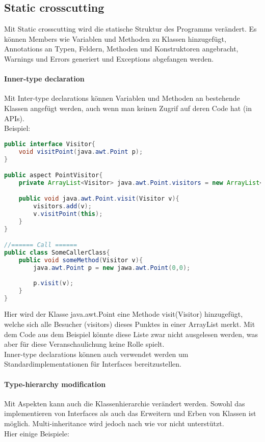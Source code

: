 

\subsection{Static crosscutting}

Mit Static crosscutting wird die statische Struktur des Programms verändert. Es können Members wie Variablen und Methoden zu Klassen hinzugefügt, Annotations an Typen, Feldern, Methoden und Konstruktoren angebracht, Warnings und Errors generiert und Exceptions abgefangen werden.

\paragraph{Inner-type declaration}

Mit Inter-type declarations können Variablen und Methoden an bestehende Klassen angefügt werden, auch wenn man keinen Zugrif auf deren Code hat (in APIs).\\Beispiel:\\


\begin{lstlisting}[language=Java]
public interface Visitor{
	void visitPoint(java.awt.Point p);
}

public aspect PointVisitor{
	private ArrayList<Visitor> java.awt.Point.visitors = new ArrayList<Visitor>();

	public void java.awt.Point.visit(Visitor v){
		visitors.add(v);
		v.visitPoint(this);
	}
}

//====== Call ======
public class SomeCallerClass{
	public void someMethod(Visitor v){
		java.awt.Point p = new jawa.awt.Point(0,0);
		
		p.visit(v);
	}
}
\end{lstlisting}

Hier wird der Klasse java.awt.Point eine Methode visit(Visitor) hinzugefügt, welche sich alle Besucher (visitors) dieses Punktes in einer ArrayList merkt. Mit dem Code aus dem Beispiel könnte diese Liste zwar nicht ausgelesen werden, was aber für diese Veranschaulichung keine Rolle spielt.\\
Inner-type declarations können auch verwendet werden um Standardimplementationen für Interfaces bereitzustellen.

\paragraph{Type-hierarchy modification}
Mit Aspekten kann auch die Klassenhierarchie verändert werden. Sowohl das implementieren von Interfaces als auch das Erweitern und Erben von Klassen ist möglich. Multi-inheritance wird jedoch nach wie vor nicht unterstützt.\\
Hier einige Beispiele:\\


